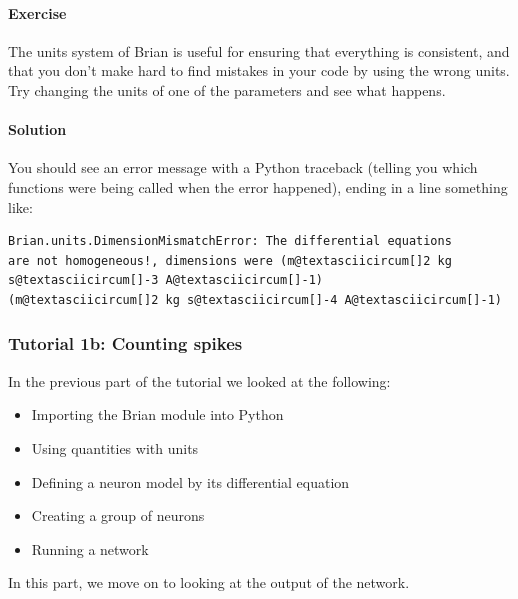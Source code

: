 \documentclass[letterpaper,10pt,english]{manual}
\begin{document}
\paragraph{Exercise}

The units system of Brian is useful for ensuring that everything
is consistent, and that you don't make hard to find mistakes in
your code by using the wrong units. Try changing the units of one
of the parameters and see what happens.


\paragraph{Solution}

You should see an error message with a Python traceback (telling
you which functions were being called when the error happened),
ending in a line something like:

\begin{Verbatim}[commandchars=@\[\]]
Brian.units.DimensionMismatchError: The differential equations
are not homogeneous!, dimensions were (m@textasciicircum[]2 kg s@textasciicircum[]-3 A@textasciicircum[]-1)
(m@textasciicircum[]2 kg s@textasciicircum[]-4 A@textasciicircum[]-1)
\end{Verbatim}

\resetcurrentobjects
\hypertarget{--doc-tutorial_1b_counting_spikes}{}

\subsubsection{Tutorial 1b: Counting spikes}

In the previous part of the tutorial we looked at the following:
\begin{itemize}
\item {} 
Importing the Brian module into Python

\item {} 
Using quantities with units

\item {} 
Defining a neuron model by its differential equation

\item {} 
Creating a group of neurons

\item {} 
Running a network

\end{itemize}

In this part, we move on to looking at the output of the network.
\end{document}
